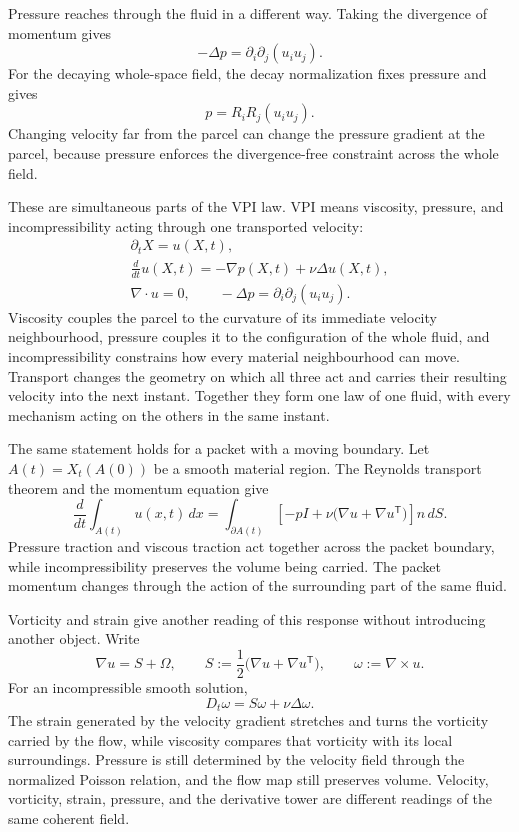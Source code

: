 Pressure reaches through the fluid in a different way.
Taking the divergence of momentum gives
\[
  -\Delta p
  =
  \partial_i\partial_j(u_i u_j).
\]
For the decaying whole-space field, the decay normalization fixes pressure and gives
\[
  p
  =
  R_iR_j(u_i u_j).
\]
Changing velocity far from the parcel can change the pressure gradient at the parcel, because pressure enforces the divergence-free constraint across the whole field.

These are simultaneous parts of the VPI law.
VPI means viscosity, pressure, and incompressibility acting through one transported velocity:
\[
  \begin{gathered}
  \partial_tX=u(X,t),\\
  \frac{d}{dt}u(X,t)
  =
  -\nabla p(X,t)
  +
  \nu\Delta u(X,t),\\
  \nabla\cdot u=0,
  \qquad
  -\Delta p=\partial_i\partial_j(u_i u_j).
  \end{gathered}
\]
Viscosity couples the parcel to the curvature of its immediate velocity neighbourhood, pressure couples it to the configuration of the whole fluid, and incompressibility constrains how every material neighbourhood can move.
Transport changes the geometry on which all three act and carries their resulting velocity into the next instant.
Together they form one law of one fluid, with every mechanism acting on the others in the same instant.

The same statement holds for a packet with a moving boundary.
Let \(A(t)=X_t(A(0))\) be a smooth material region.
The Reynolds transport theorem and the momentum equation give
\[
  \frac{d}{dt}\int_{A(t)}u(x,t)\,dx
  =
  \int_{\partial A(t)}
  \left[
    -pI
    +
    \nu\bigl(\nabla u+\nabla u^{\mathsf T}\bigr)
  \right]n\,dS.
\]
Pressure traction and viscous traction act together across the packet boundary, while incompressibility preserves the volume being carried.
The packet momentum changes through the action of the surrounding part of the same fluid.

Vorticity and strain give another reading of this response without introducing another object.
Write
\[
  \nabla u=S+\Omega,
  \qquad
  S:=\frac12\bigl(\nabla u+\nabla u^{\mathsf T}\bigr),
  \qquad
  \omega:=\nabla\times u.
\]
For an incompressible smooth solution,
\[
  D_t\omega
  =
  S\omega+\nu\Delta\omega.
\]
The strain generated by the velocity gradient stretches and turns the vorticity carried by the flow, while viscosity compares that vorticity with its local surroundings.
Pressure is still determined by the velocity field through the normalized Poisson relation, and the flow map still preserves volume.
Velocity, vorticity, strain, pressure, and the derivative tower are different readings of the same coherent field.

